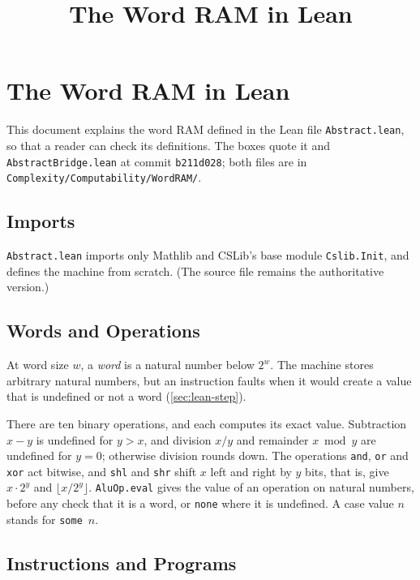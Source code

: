 \documentclass[11pt]{article}
\title{The Word RAM in Lean}
\author{}
\date{}
\newcommand{\leanitem}[1]{\leansep\def\leansep{\vspace{2pt}}}
\newcommand{\leansnippet}[1]{\begin{leanbox}\def\leansep{}\let\do\leanitem\docsvlist{#1}\end{leanbox}}
\newcommand{\lean}[1]{\texttt{#1}}
\newcommand{\file}[1]{\texttt{#1}}
\begin{document}
\maketitle

\section{The Word RAM in Lean}\label{sec:lean}

This document explains the word RAM defined in the Lean file \file{Abstract.lean}, so that a
reader can check its definitions.
The boxes quote it and \file{AbstractBridge.lean} at commit \texttt{b211d028}; both files are
in \file{Complexity/Computability/WordRAM/}.

\subsection{Imports}

\file{Abstract.lean} imports only Mathlib and CSLib's base module \lean{Cslib.Init}, and
defines the machine from scratch.
(The source file remains the authoritative version.)

\leansnippet{Imports}

\subsection{Words and Operations}

At word size $w$, a \emph{word} is a natural number below $2^w$.
The machine stores arbitrary natural numbers, but an instruction faults when it would
create a value that is undefined or not a word (\cref{sec:lean-step}).

There are ten binary operations, and each computes its exact value.
Subtraction $x-y$ is undefined for $y>x$, and division $x/y$ and remainder $x \bmod y$ are
undefined for $y=0$; otherwise division rounds down.
The operations \lean{and}, \lean{or} and \lean{xor} act bitwise,
and \lean{shl} and \lean{shr} shift $x$ left and right by $y$ bits,
that is, give $x\cdot 2^y$ and $\lfloor x/2^y\rfloor$.
\lean{AluOp.eval} gives the value of an operation on natural numbers, before any check that
it is a word, or \lean{none} where it is undefined.
A case value $n$ stands for \lean{some}~$n$.

\leansnippet{AluOp,AluOp.eval}

\subsection{Instructions and Programs}
\end{document}
